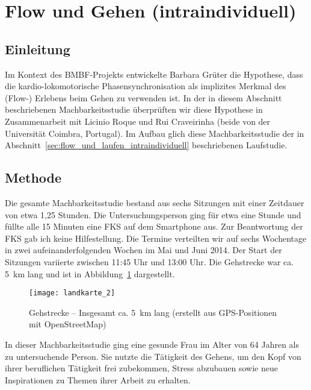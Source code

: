 

\section{Flow und Gehen (intraindividuell)} 

\label{sec:flow_und_gehen_intraindividuell}

\subsection{Einleitung} 

\label{sub:einleitung_5_2}

Im Kontext des \acs{BMBF}-Projekts entwickelte Barbara Grüter die Hypothese, dass die kardio-lokomotorische Phasensynchronisation als implizites Merkmal des (Flow-) Erlebens beim Gehen zu verwenden ist. In der in diesem Abschnitt beschriebenen Machbarkeitsstudie überprüften wir diese Hypothese in Zusammenarbeit mit Licinio Roque und Rui Craveirinha (beide von der Universität Coimbra, Portugal). Im Aufbau glich diese Machbarkeitsstudie der in Abschnitt~\ref{sec:flow_und_laufen_intraindividuell} beschriebenen Laufstudie. 

\subsection{Methode} 

\label{sub:methode_5_2}

Die gesamte Machbarkeitsstudie bestand aus sechs Sitzungen mit einer Zeitdauer von etwa 1,25 Stunden. Die Untersuchungsperson ging für etwa eine Stunde und füllte alle 15 Minuten eine \ac{FKS} auf dem Smartphone aus. Zur Beantwortung der \ac{FKS} gab ich keine Hilfestellung. Die Termine verteilten wir auf sechs Wochentage in zwei aufeinanderfolgenden Wochen im Mai und Juni 2014. Der Start der Sitzungen variierte zwischen 11:45 Uhr und 13:00 Uhr. Die Gehstrecke war ca. 5~km lang und ist in Abbildung~\ref{fig:landkarte_2} dargestellt. 
\begin{figure}
	[!htb] \centering 
	\texttt{[image: landkarte\_2]} \caption[Gehstrecke]{Gehstrecke -- Insgesamt ca. 5~km lang (erstellt aus \acs{GPS}-Positionen mit OpenStreetMap)} \label{fig:landkarte_2} 
\end{figure}

In dieser Machbarkeitsstudie ging eine gesunde Frau im Alter von 64 Jahren als zu untersuchende Person. Sie nutzte die Tätigkeit des Gehens, um den Kopf von ihrer beruflichen Tätigkeit frei zubekommen, Stress abzubauen sowie neue Inspirationen zu Themen ihrer Arbeit zu erhalten.

